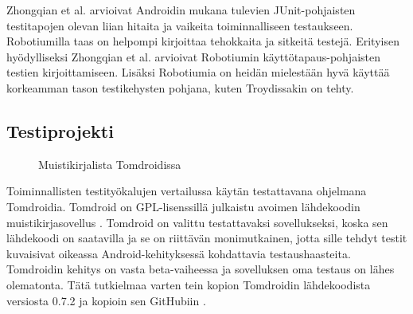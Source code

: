 Zhongqian et al. \cite{zhongqianetal} arvioivat Androidin mukana tulevien JUnit-pohjaisten testitapojen olevan liian hitaita ja vaikeita toiminnalliseen testaukseen. Robotiumilla taas on helpompi kirjoittaa tehokkaita ja sitkeitä testejä. Erityisen hyödylliseksi Zhongqian et al. arvioivat Robotiumin käyttötapaus-pohjaisten testien kirjoittamiseen. Lisäksi Robotiumia on heidän mielestään hyvä käyttää korkeamman tason testikehysten pohjana, kuten Troydissakin on tehty.


\subsection{Testiprojekti}
\label{tomdroid}

\begin{figure}[h]
\centering
{}
\caption{Muistikirjalista Tomdroidissa} \label{tomdroid_notelist}
\end{figure}

Toiminnallisten testityökalujen vertailussa käytän testattavana ohjelmana Tomdroidia. Tomdroid on GPL-lisenssillä julkaistu avoimen lähdekoodin muistikirjasovellus \cite{tomdroid}. Tomdroid on valittu testattavaksi sovellukseksi, koska sen lähdekoodi on saatavilla ja se on riittävän monimutkainen, jotta sille tehdyt testit kuvaisivat oikeassa Android-kehityksessä kohdattavia testaushaasteita. Tomdroidin kehitys on vasta beta-vaiheessa ja sovelluksen oma testaus on lähes olematonta. Tätä tutkielmaa varten tein kopion Tomdroidin lähdekoodista versiosta 0.7.2 ja kopioin sen GitHubiin \cite{tomdroid_github}.

